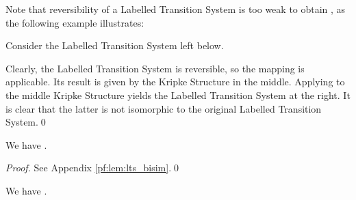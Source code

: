 \documentclass{llncs}
\newcommand{\lts}{\mathsf{lts}}
\newcommand{\ks}{\mathsf{ks}}
\begin{document}
\newcommand{\simKS}{\sim_{\ks}}
\newcommand{\simLTS}{\sim_{\lts}}


Note that reversibility of a Labelled Transition System  is too
weak to obtain , as the following example
illustrates:
\begin{example}
Consider the Labelled Transition System left below.
\begin{center}
\end{center}
Clearly, the
Labelled Transition System
is reversible, so the mapping  is applicable. Its result is
given by the Kripke Structure in the middle. Applying  to the middle Kripke Structure
yields the Labelled Transition System at the right. It is clear that the latter is not isomorphic
to the original Labelled Transition System.\qed
\end{example}

\begin{lemma}
\label{lem:lts_bisim} We have .

\end{lemma}


\begin{proof}
See Appendix \ref{pf:lem:lts_bisim}.\qed
\end{proof}


\begin{lemma}
\label{lem:lts_stut}
We have .
\end{lemma}
\end{document}
